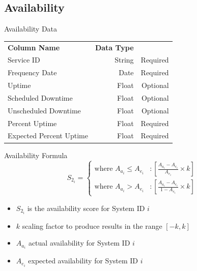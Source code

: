    \subsection{Availability}
        \begin{frame}{Availability Data}
            \centering
            \begin{tabular}{l | r | r}
            {\bfseries Column Name}
                 & {\bfseries Data Type}
                 &  \\
                
                Service ID & String  & Required \\
                \myrowcolour%
                Frequency Date & Date & Required \\
                Uptime & Float & Optional \\
                \myrowcolour%
                Scheduled Downtime & Float & Optional \\
                Unscheduled Downtime & Float  & Optional \\
                \myrowcolour%
                Percent Uptime & Float & Required \\
                Expected Percent Uptime & Float & Required \\
            \end{tabular}
        \end{frame} 
        \begin{frame}{Availability Formula }
            \begin{displaymath}
               S_{2_i} = \left\{
                 \begin{array}{lr}
                   \text{where } A_{a_i} \leq A_{e_i} & : \left[ \frac{A_{a_i} - A_{e_i}}{A_{e_i}}\times k \right] \\
                   \text{where } A_{a_i} > A_{e_i}  & : \left[ \frac{A_{a_i} - A_{e_i} }{1-A_{e_i}}\times k \right]
                 \end{array}
               \right. 
            \end{displaymath}
            
            \begin{itemize}
                \item $S_{2_i}$ is the availability score for System ID $i$
                \item $k$ scaling factor to produce results in the range $[-k,k]$
                \item $A_{a_i}$ actual availability for System ID $i$
                \item $A_{e_i}$ expected availability for System ID $i$
            \end{itemize}
        \end{frame} 

